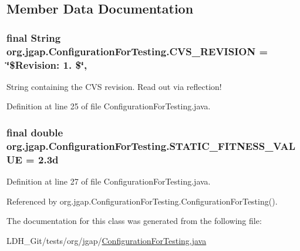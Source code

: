 \subsection{Member Data Documentation}
\hypertarget{classorg_1_1jgap_1_1_configuration_for_testing_a1b1e44449b7b2644893e6c220e122f5e}{
\subsubsection[{C\-V\-S\-\_\-\-R\-E\-V\-I\-S\-I\-O\-N}]{\setlength{\rightskip}{0pt plus 5cm}final String org.\-jgap.\-Configuration\-For\-Testing.\-C\-V\-S\-\_\-\-R\-E\-V\-I\-S\-I\-O\-N = \char`\"{}\$Revision\-: 1. \$\char`\"{}\hspace{0.3cm}{\ttfamily [static]}, {\ttfamily [private]}}}\label{classorg_1_1jgap_1_1_configuration_for_testing_a1b1e44449b7b2644893e6c220e122f5e}
String containing the C\-V\-S revision. Read out via reflection! 

Definition at line 25 of file Configuration\-For\-Testing.\-java.

\hypertarget{classorg_1_1jgap_1_1_configuration_for_testing_a69f5e27bab8d766f102ab0ddee23d1d9}{
\subsubsection[{S\-T\-A\-T\-I\-C\-\_\-\-F\-I\-T\-N\-E\-S\-S\-\_\-\-V\-A\-L\-U\-E}]{\setlength{\rightskip}{0pt plus 5cm}final double org.\-jgap.\-Configuration\-For\-Testing.\-S\-T\-A\-T\-I\-C\-\_\-\-F\-I\-T\-N\-E\-S\-S\-\_\-\-V\-A\-L\-U\-E = 2.\-3d\hspace{0.3cm}{\ttfamily [static]}}}\label{classorg_1_1jgap_1_1_configuration_for_testing_a69f5e27bab8d766f102ab0ddee23d1d9}


Definition at line 27 of file Configuration\-For\-Testing.\-java.



Referenced by org.\-jgap.\-Configuration\-For\-Testing.\-Configuration\-For\-Testing().



The documentation for this class was generated from the following file\-:\begin{DoxyCompactItemize}
\item 
L\-D\-H\-\_\-\-Git/tests/org/jgap/\hyperlink{_configuration_for_testing_8java}{Configuration\-For\-Testing.\-java}\end{DoxyCompactItemize}
